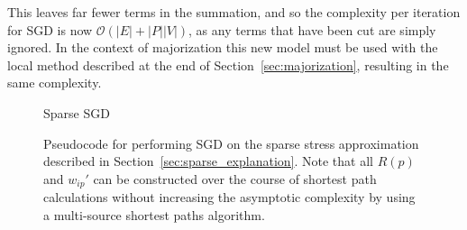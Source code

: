 This leaves far fewer terms in the summation, and so the complexity per iteration for SGD is now $\mathcal{O}(|E| + |P||V|)$, as any terms that have been cut are simply ignored. In the context of majorization this new model must be used with the local method described at the end of Section~\ref{sec:majorization}, resulting in the same complexity.

\begin{figure}
  \removeAlgorithmFigureError
  \begin{algorithm}[H]
     
  
    \caption{Sparse SGD}
    \label{alg:sparse}
  \end{algorithm}

  \caption[Pseudocode for sparse stochastic gradient descent]{Pseudocode for performing SGD on the sparse stress approximation described in Section~\ref{sec:sparse_explanation}.
  Note that all $R(p)$ and $w_{ip}'$ can be constructed over the course of shortest path calculations without increasing the asymptotic complexity \citep{Ortmann2017} by using a multi-source shortest paths algorithm.
  \label{fig:pseudo_sparse}
  }
\end{figure}


